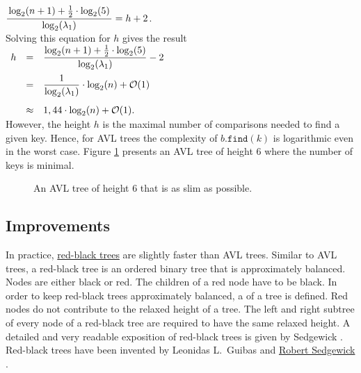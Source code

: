 \hspace*{1.3cm}
$\ds \bruch{\log_2(n+1) + \frac{1}{2}\cdot \log_2(5)}{\log_2(\lambda_1)} = h+2$.
\\[0.2cm]
Solving this equation for  $h$ gives the result 
\\[0.4cm]
\hspace*{1.3cm} 
$
\begin{array}[t]{lcl}
h & = & \displaystyle \frac{\log_2(n+1) + \frac{1}{2}\cdot \log_2(5)}{\log_2(\lambda_1)} - 2 \\[0.4cm]
  & = & \displaystyle \frac{1}{\log_2(\lambda_1)}\cdot \log_2(n) + \mathcal{O}(1) \\[0.5cm]
  & \approx & 1,44 \cdot \log_2(n) + \mathcal{O}(1).
\end{array} 
$
\\[0.2cm]
However, the height $h$ is the maximal number of comparisons needed to find a given key.
Hence, for AVL trees the complexity of $b.\texttt{find}(k)$ is logarithmic even in the worst case.
Figure 
\ref{fig:avl-worst-case} presents an  AVL tree of height 6 where the number of keys is minimal.



\begin{figure}[!ht]
  \centering
  \caption{An AVL tree of height 6 that is as slim as possible.}
  \label{fig:avl-worst-case}
\end{figure}

\subsection{Improvements}
In practice, 
\href{https://en.wikipedia.org/wiki/Red-black_trees}{red-black trees} 
are slightly faster than \textsc{AVL} trees.  Similar to
\textsc{AVL} trees, a  red-black tree
  is an ordered binary tree that is approximately balanced.  Nodes are either black or red.
The children of a red node have to be black.  In order to keep red-black trees approximately
balanced, a  of a tree is defined.  Red nodes do not contribute to the relaxed
height of a tree.  The left and right subtree of every node of a red-black tree are required to have the same 
relaxed height.  A detailed and very readable exposition of red-black trees is given by Sedgewick
\cite{sedgewick:2011}.  Red-black trees have been invented by Leonidas L.~Guibas and 
\href{https://en.wikipedia.org/wiki/Robert_Sedgewick_(computer_scientist)}{Robert Sedgewick} \cite{guibas:78}.

